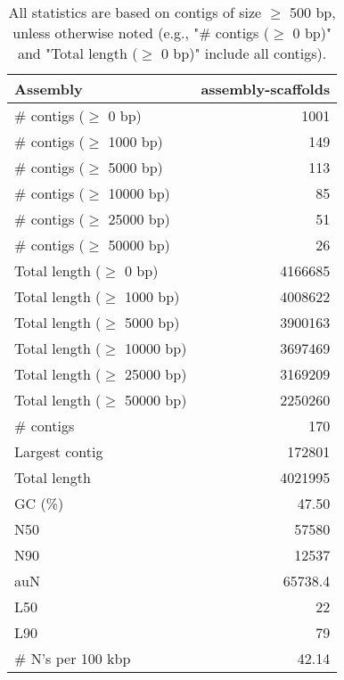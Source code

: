 \documentclass[12pt,a4paper]{article}
\begin{document}
\begin{table}[ht]
\begin{center}
\caption{All statistics are based on contigs of size $\geq$ 500 bp, unless otherwise noted (e.g., "\# contigs ($\geq$ 0 bp)" and "Total length ($\geq$ 0 bp)" include all contigs).}
\begin{tabular}{|l*{1}{|r}|}
\hline
Assembly & assembly-scaffolds \\ \hline
\# contigs ($\geq$ 0 bp) & 1001 \\ \hline
\# contigs ($\geq$ 1000 bp) & 149 \\ \hline
\# contigs ($\geq$ 5000 bp) & 113 \\ \hline
\# contigs ($\geq$ 10000 bp) & 85 \\ \hline
\# contigs ($\geq$ 25000 bp) & 51 \\ \hline
\# contigs ($\geq$ 50000 bp) & 26 \\ \hline
Total length ($\geq$ 0 bp) & 4166685 \\ \hline
Total length ($\geq$ 1000 bp) & 4008622 \\ \hline
Total length ($\geq$ 5000 bp) & 3900163 \\ \hline
Total length ($\geq$ 10000 bp) & 3697469 \\ \hline
Total length ($\geq$ 25000 bp) & 3169209 \\ \hline
Total length ($\geq$ 50000 bp) & 2250260 \\ \hline
\# contigs & 170 \\ \hline
Largest contig & 172801 \\ \hline
Total length & 4021995 \\ \hline
GC (\%) & 47.50 \\ \hline
N50 & 57580 \\ \hline
N90 & 12537 \\ \hline
auN & 65738.4 \\ \hline
L50 & 22 \\ \hline
L90 & 79 \\ \hline
\# N's per 100 kbp & 42.14 \\ \hline
\end{tabular}
\end{center}
\end{table}
\end{document}
